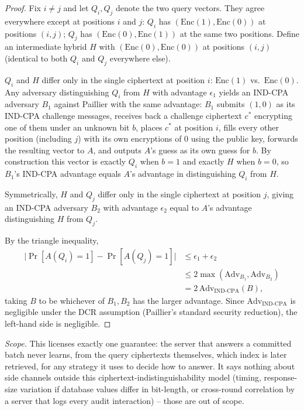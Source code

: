 \documentclass[10pt,journal,compsoc]{IEEEtran}
\begin{document}
\begin{proof}
Fix $i \neq j$ and let $Q_i, Q_j$ denote the two query vectors. They agree everywhere except at positions $i$ and $j$: $Q_i$ has $(\mathrm{Enc}(1),\mathrm{Enc}(0))$ at positions $(i,j)$; $Q_j$ has $(\mathrm{Enc}(0),\mathrm{Enc}(1))$ at the same two positions. Define an intermediate hybrid $H$ with $(\mathrm{Enc}(0),\mathrm{Enc}(0))$ at positions $(i,j)$ (identical to both $Q_i$ and $Q_j$ everywhere else).

$Q_i$ and $H$ differ only in the single ciphertext at position $i$: $\mathrm{Enc}(1)$ vs.\ $\mathrm{Enc}(0)$. Any adversary distinguishing $Q_i$ from $H$ with advantage $\epsilon_1$ yields an IND-CPA adversary $B_1$ against Paillier with the same advantage: $B_1$ submits $(1,0)$ as its IND-CPA challenge messages, receives back a challenge ciphertext $c^\ast$ encrypting one of them under an unknown bit $b$, places $c^\ast$ at position $i$, fills every other position (including $j$) with its own encryptions of $0$ using the public key, forwards the resulting vector to $A$, and outputs $A$'s guess as its own guess for $b$. By construction this vector is exactly $Q_i$ when $b=1$ and exactly $H$ when $b=0$, so $B_1$'s IND-CPA advantage equals $A$'s advantage in distinguishing $Q_i$ from $H$.

Symmetrically, $H$ and $Q_j$ differ only in the single ciphertext at position $j$, giving an IND-CPA adversary $B_2$ with advantage $\epsilon_2$ equal to $A$'s advantage distinguishing $H$ from $Q_j$.

By the triangle inequality,
\begin{align*}
\bigl|\Pr[A(Q_i){=}1]-\Pr[A(Q_j){=}1]\bigr| &\le \epsilon_1+\epsilon_2 \\
&\le 2\max(\mathrm{Adv}_{B_1},\mathrm{Adv}_{B_2}) \\
&= 2\,\mathrm{Adv}_{\text{IND-CPA}}(B),
\end{align*}
taking $B$ to be whichever of $B_1,B_2$ has the larger advantage. Since $\mathrm{Adv}_{\text{IND-CPA}}$ is negligible under the DCR assumption (Paillier's standard security reduction), the left-hand side is negligible.
\end{proof}

\noindent \emph{Scope.} This licenses exactly one guarantee: the server that answers a committed batch never learns, from the query ciphertexts themselves, which index is later retrieved, for any strategy it uses to decide how to answer. It says nothing about side channels outside this ciphertext-indistinguishability model (timing, response-size variation if database values differ in bit-length, or cross-round correlation by a server that logs every audit interaction) -- those are out of scope.
\end{document}
